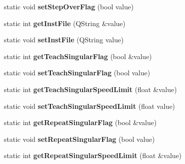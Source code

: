 \begin{DoxyCompactItemize}
\item 
\hypertarget{classAppConf_a73c73c0982424ed4ec465ea7864ce08c}{static void {\bfseries set\-Step\-Over\-Flag} (bool value)}\label{classAppConf_a73c73c0982424ed4ec465ea7864ce08c}

\item 
\hypertarget{classAppConf_a19ddd80f4fc3d4b1d8015dbf294eb525}{static int {\bfseries get\-Inst\-File} (Q\-String \&value)}\label{classAppConf_a19ddd80f4fc3d4b1d8015dbf294eb525}

\item 
\hypertarget{classAppConf_a31607cff7caabbe471aecb6ef05084ab}{static void {\bfseries set\-Inst\-File} (Q\-String value)}\label{classAppConf_a31607cff7caabbe471aecb6ef05084ab}

\item 
\hypertarget{classAppConf_a97eb165a96672d83112759d60576ad29}{static int {\bfseries get\-Teach\-Singular\-Flag} (bool \&value)}\label{classAppConf_a97eb165a96672d83112759d60576ad29}

\item 
\hypertarget{classAppConf_a99f8f2bee8d9e247d1ed3985e3e0c483}{static void {\bfseries set\-Teach\-Singular\-Flag} (bool value)}\label{classAppConf_a99f8f2bee8d9e247d1ed3985e3e0c483}

\item 
\hypertarget{classAppConf_a655a14bb93233a2fb248dde01d76dec9}{static int {\bfseries get\-Teach\-Singular\-Speed\-Limit} (float \&value)}\label{classAppConf_a655a14bb93233a2fb248dde01d76dec9}

\item 
\hypertarget{classAppConf_abafc500c57649943ec78b9514099f463}{static void {\bfseries set\-Teach\-Singular\-Speed\-Limit} (float value)}\label{classAppConf_abafc500c57649943ec78b9514099f463}

\item 
\hypertarget{classAppConf_a9d83f77469af4f5c1057d2409b7dccf0}{static int {\bfseries get\-Repeat\-Singular\-Flag} (bool \&value)}\label{classAppConf_a9d83f77469af4f5c1057d2409b7dccf0}

\item 
\hypertarget{classAppConf_a452fb4a6a8d557a1ae89990a5303b613}{static void {\bfseries set\-Repeat\-Singular\-Flag} (bool value)}\label{classAppConf_a452fb4a6a8d557a1ae89990a5303b613}

\item 
\hypertarget{classAppConf_ae18660875fef1c4fc6a95227872cddb8}{static int {\bfseries get\-Repeat\-Singular\-Speed\-Limit} (float \&value)}\label{classAppConf_ae18660875fef1c4fc6a95227872cddb8}


\end{DoxyCompactItemize}
